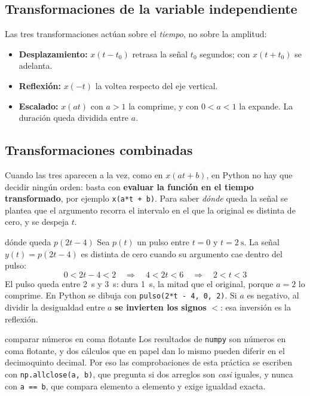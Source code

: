 \documentclass[11pt,a4paper]{article}
\newcommand{\py}[1]{\texttt{#1}}
\begin{document}
\subsection{Transformaciones de la variable independiente}
Las tres transformaciones actúan sobre el \emph{tiempo}, no sobre la amplitud:

\begin{itemize}
    \item \textbf{Desplazamiento:} $x(t - t_0)$ retrasa la señal $t_0$ segundos; con
          $x(t + t_0)$ se adelanta.
    \item \textbf{Reflexión:} $x(-t)$ la voltea respecto del eje vertical.
    \item \textbf{Escalado:} $x(at)$ con $a > 1$ la comprime, y con $0 < a < 1$ la
          expande. La duración queda dividida entre $a$.
\end{itemize}

\subsection{Transformaciones combinadas}
Cuando las tres aparecen a la vez, como en $x(at + b)$, en Python no hay que decidir
ningún orden: basta con \textbf{evaluar la función en el tiempo transformado}, por
ejemplo \py{x(a*t + b)}. Para saber \emph{dónde} queda la señal se plantea que el
argumento recorra el intervalo en el que la original es distinta de cero, y se despeja
$t$.

\begin{ejemplo}{dónde queda $p(2t-4)$}
Sea $p(t)$ un pulso entre $t = 0$ y $t = \qty{2}{\second}$. La señal $y(t) = p(2t - 4)$
es distinta de cero cuando su argumento cae dentro del pulso:
\begin{equation*}
  0 < 2t - 4 < 2 \quad\Longrightarrow\quad 4 < 2t < 6 \quad\Longrightarrow\quad 2 < t < 3
\end{equation*}
El pulso queda entre \qty{2}{\second} y \qty{3}{\second}: dura \qty{1}{\second}, la mitad
que el original, porque $a = 2$ lo comprime. En Python se dibuja con
\py{pulso(2*t - 4, 0, 2)}. Si $a$ es negativo, al dividir la desigualdad entre $a$
\textbf{se invierten los signos} $<$: esa inversión es la reflexión.
\end{ejemplo}

\begin{notatec}{comparar números en coma flotante}
Los resultados de \py{numpy} son números en coma flotante, y dos cálculos que en papel
dan lo mismo pueden diferir en el decimoquinto decimal. Por eso las comprobaciones de
esta práctica se escriben con \py{np.allclose(a, b)}, que pregunta si dos arreglos son
\emph{casi} iguales, y nunca con \py{a == b}, que compara elemento a elemento y exige
igualdad exacta.
\end{notatec}
\end{document}
